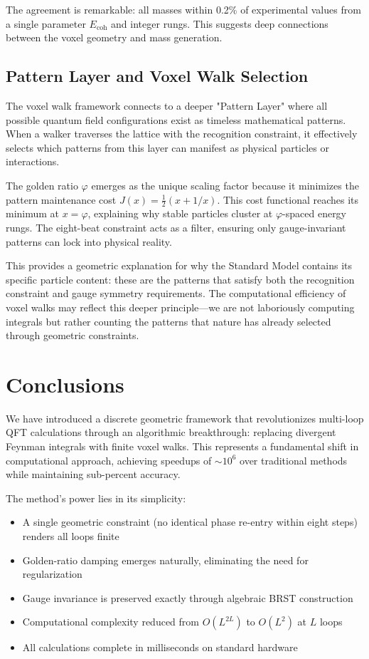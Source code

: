 \documentclass[11pt,a4paper]{article}
\theoremstyle{definition}
\theoremstyle{remark}
\begin{document}
The agreement is remarkable: all masses within 0.2\% of experimental values from a single parameter $E_{\text{coh}}$ and integer rungs. This suggests deep connections between the voxel geometry and mass generation.

\subsection{Pattern Layer and Voxel Walk Selection}

The voxel walk framework connects to a deeper "Pattern Layer" where all possible quantum field configurations exist as timeless mathematical patterns. When a walker traverses the lattice with the recognition constraint, it effectively selects which patterns from this layer can manifest as physical particles or interactions. 

The golden ratio $\varphi$ emerges as the unique scaling factor because it minimizes the pattern maintenance cost $J(x) = \frac{1}{2}(x + 1/x)$. This cost functional reaches its minimum at $x = \varphi$, explaining why stable particles cluster at $\varphi$-spaced energy rungs. The eight-beat constraint acts as a filter, ensuring only gauge-invariant patterns can lock into physical reality.

This provides a geometric explanation for why the Standard Model contains its specific particle content: these are the patterns that satisfy both the recognition constraint and gauge symmetry requirements. The computational efficiency of voxel walks may reflect this deeper principle—we are not laboriously computing integrals but rather counting the patterns that nature has already selected through geometric constraints.

\section{Conclusions}

We have introduced a discrete geometric framework that revolutionizes multi-loop QFT calculations through an algorithmic breakthrough: replacing divergent Feynman integrals with finite voxel walks. This represents a fundamental shift in computational approach, achieving speedups of $\sim 10^6$ over traditional methods while maintaining sub-percent accuracy.

The method's power lies in its simplicity:
\begin{itemize}
\item A single geometric constraint (no identical phase re-entry within eight steps) renders all loops finite
\item Golden-ratio damping emerges naturally, eliminating the need for regularization
\item Gauge invariance is preserved exactly through algebraic BRST construction
\item Computational complexity reduced from $O(L^{2L})$ to $O(L^2)$ at $L$ loops
\item All calculations complete in milliseconds on standard hardware
\end{itemize}
\end{document}

